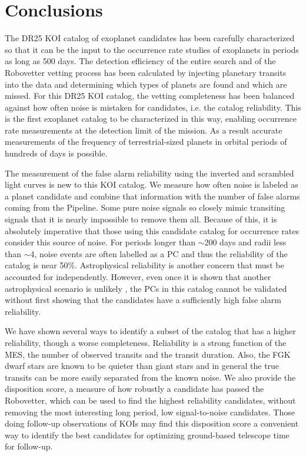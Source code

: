 

\section{Conclusions}

The DR25 KOI catalog of exoplanet candidates has been carefully characterized so that it can be the input to the occurrence rate studies of exoplanets in periods as long as 500 days. The detection efficiency of the entire search \citep{Burke2017b,Christiansen2017} and of the Robovetter vetting process has been calculated by injecting planetary transits into the data and determining which types of planets are found and which are missed. For this DR25 KOI catalog, the vetting completeness has been balanced against how often noise is mistaken for candidates, i.e. the catalog reliability. This is the first \Kepler{} exoplanet catalog to be characterized in this way, enabling occurrence rate measurements at the detection limit of the mission.  As a result accurate measurements of the frequency of terrestrial-sized planets in orbital periods of hundreds of days is possible.

The measurement of the false alarm reliability using the inverted and scrambled light curves is new to this KOI catalog. We measure how often noise is labeled as a planet candidate and combine that information with the number of false alarms coming from the \Kepler{} Pipeline. Some pure noise signals so closely mimic transiting signals that it is nearly impossible to remove them all. Because of this, it is absolutely imperative that those using this candidate catalog for occurrence rates consider this source of noise. For periods longer than $\sim$200 days and radii less than $\sim$4\Rearth, noise events are often labelled as a PC and thus the reliability of the catalog is near 50\%.  Astrophysical reliability is another concern that must be accounted for independently.  However, even once it is shown that another astrophysical scenario is unlikely \citep[as was done for the DR24 KOIs in ][]{Morton2017}, the PCs in this catalog cannot be validated without first showing that the candidates have a sufficiently high false alarm reliability. 

We have shown several ways to identify a subset of the catalog that has a higher reliability, though a worse completeness. Reliability is a strong function of the MES, the number of observed transits and the transit duration. Also, the FGK dwarf stars are known to be quieter than giant stars and in general the true transits can be more easily separated from the known noise. We also provide the disposition score, a measure of how robustly a candidate has passed the Robovetter, which can be used to find the highest reliability candidates, without removing the most interesting long period, low signal-to-noise candidates. Those doing follow-up observations of KOIs may find this disposition score a convenient way to identify the best candidates for optimizing ground-based telescope time for follow-up.

